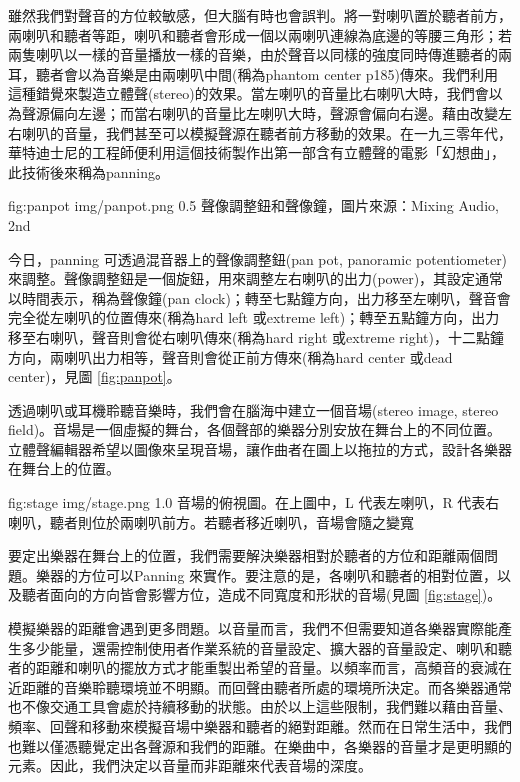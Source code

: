 \documentclass[12pt,a4paper,oneside]{report}
\begin{document}
雖然我們對聲音的方位較敏感，但大腦有時也會誤判。將一對喇叭置於聽者前方，兩喇叭和聽者等距，喇叭和聽者會形成一個以兩喇叭連線為底邊的等腰三角形；若兩隻喇叭以一樣的音量播放一樣的音樂，由於聲音以同樣的強度同時傳進聽者的兩耳，聽者會以為音樂是由兩喇叭中間(稱為phantom center \cite{maxing_audio}{p185})傳來。我們利用這種錯覺來製造立體聲(stereo)的效果。當左喇叭的音量比右喇叭大時，我們會以為聲源偏向左邊；而當右喇叭的音量比左喇叭大時，聲源會偏向右邊。藉由改變左右喇叭的音量，我們甚至可以模擬聲源在聽者前方移動的效果。在一九三零年代，華特迪士尼的工程師便利用這個技術製作出第一部含有立體聲的電影「幻想曲」\cite{fantasia}，此技術後來稱為panning。

\figurewithcaption
{fig:panpot}
{img/panpot.png}
{0.5}
{聲像調整鈕和聲像鐘，圖片來源：Mixing Audio, 2nd}

今日，panning 可透過混音器上的聲像調整鈕(pan pot, panoramic potentiometer)來調整。聲像調整鈕是一個旋鈕，用來調整左右喇叭的出力(power)，其設定通常以時間表示，稱為聲像鐘(pan clock)；轉至七點鐘方向，出力移至左喇叭，聲音會完全從左喇叭的位置傳來(稱為hard left 或extreme left)；轉至五點鐘方向，出力移至右喇叭，聲音則會從右喇叭傳來(稱為hard right 或extreme right)，十二點鐘方向，兩喇叭出力相等，聲音則會從正前方傳來(稱為hard center 或dead center)，見圖 \ref{fig:panpot}。


透過喇叭或耳機聆聽音樂時，我們會在腦海中建立一個音場(stereo image, stereo field)。音場是一個虛擬的舞台，各個聲部的樂器分別安放在舞台上的不同位置。 立體聲編輯器希望以圖像來呈現音場，讓作曲者在圖上以拖拉的方式，設計各樂器在舞台上的位置。

\figurewithcaption
{fig:stage}
{img/stage.png}
{1.0}
{音場的俯視圖。在上圖中，L 代表左喇叭，R 代表右喇叭，聽者則位於兩喇叭前方。若聽者移近喇叭，音場會隨之變寬}

要定出樂器在舞台上的位置，我們需要解決樂器相對於聽者的方位和距離兩個問題。樂器的方位可以Panning 來實作。要注意的是，各喇叭和聽者的相對位置，以及聽者面向的方向皆會影響方位，造成不同寬度和形狀的音場(見圖 \ref{fig:stage})。

模擬樂器的距離會遇到更多問題。以音量而言，我們不但需要知道各樂器實際能產生多少能量，還需控制使用者作業系統的音量設定、擴大器的音量設定、喇叭和聽者的距離和喇叭的擺放方式才能重製出希望的音量。以頻率而言，高頻音的衰減在近距離的音樂聆聽環境並不明顯。而回聲由聽者所處的環境所決定。而各樂器通常也不像交通工具會處於持續移動的狀態。由於以上這些限制，我們難以藉由音量、頻率、回聲和移動來模擬音場中樂器和聽者的絕對距離。然而在日常生活中，我們也難以僅憑聽覺定出各聲源和我們的距離。在樂曲中，各樂器的音量才是更明顯的元素。因此，我們決定以音量而非距離來代表音場的深度。
\end{document}
